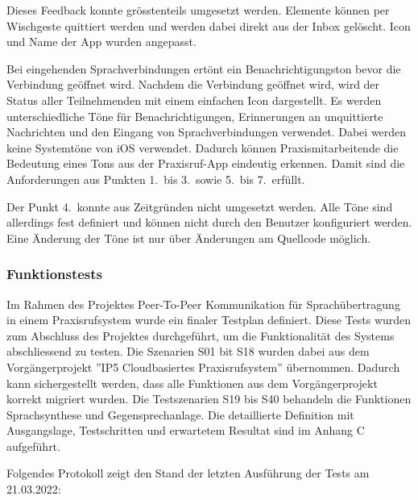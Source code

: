 Dieses Feedback konnte grösstenteils umgesetzt werden.
Elemente können per Wischgeste quittiert werden und werden dabei direkt aus der Inbox gelöscht.
Icon und Name der App wurden angepasst.

Bei eingehenden Sprachverbindungen ertönt ein Benachrichtigungston bevor die Verbindung geöffnet wird.
Nachdem die Verbindung geöffnet wird, wird der Status aller Teilnehmenden mit einem einfachen Icon dargestellt.
Es werden unterschiedliche Töne für Benachrichtigungen, Erinnerungen an unquittierte Nachrichten und den Eingang von Sprachverbindungen verwendet.
Dabei werden keine Systemtöne von iOS verwendet.
Dadurch können Praxismitarbeitende die Bedeutung eines Tons aus der Praxisruf-App eindeutig erkennen.
Damit sind die Anforderungen aus Punkten 1.\ bis 3.\ sowie 5.\ bis 7.\ erfüllt.

Der Punkt 4.\ konnte aus Zeitgründen nicht umgesetzt werden.
Alle Töne sind allerdings fest definiert und können nicht durch den Benutzer konfiguriert werden.
Eine Änderung der Töne ist nur über Änderungen am Quellcode möglich.

\clearpage

\subsubsection{Funktionstests}

Im Rahmen des Projektes Peer-To-Peer Kommunikation für Sprachübertragung in einem Praxisrufsystem wurde ein finaler Testplan definiert.
Diese Tests wurden zum Abschluss des Projektes durchgeführt, um die Funktionalität des Systems abschliessend zu testen.
Die Szenarien S01 bit S18 wurden dabei aus dem Vorgängerprojekt ''IP5 Cloudbasiertes Praxisrufsystem'' übernommen.
Dadurch kann sichergestellt werden, dass alle Funktionen aus dem Vorgängerprojekt korrekt migriert wurden.
Die Testszenarien S19 bis S40 behandeln die Funktionen Sprachsynthese und Gegensprechanlage.
Die detaillierte Definition mit Ausgangslage, Testschritten und erwartetem Resultat sind im Anhang C aufgeführt.

Folgendes Protokoll zeigt den Stand der letzten Ausführung der Tests am 21.03.2022:

